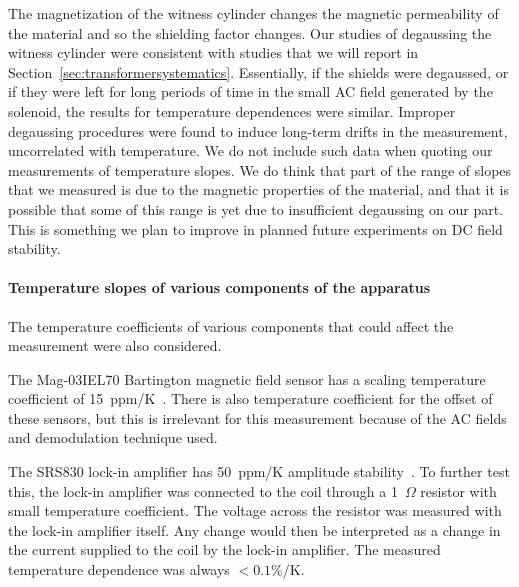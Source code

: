 



The magnetization of the witness cylinder changes the magnetic
permeability of the material and so the shielding factor changes.  Our
studies of degaussing the witness cylinder were consistent with
studies that we will report in
Section~\ref{sec:transformersystematics}.  Essentially, if the shields
were degaussed, or if they were left for long periods of time in the
small AC field generated by the solenoid, the results for temperature
dependences were similar.  Improper degaussing procedures were found
to induce long-term drifts in the measurement, uncorrelated with
temperature.  We do not include such data when quoting our
measurements of temperature slopes.  We do think that part of the
range of slopes that we measured is due to the magnetic properties of
the material, and that it is possible that some of this range is yet
due to insufficient degaussing on our part.  This is something we plan
to improve in planned future experiments on DC field stability.



\paragraph{Temperature slopes of various components of the apparatus}

The temperature coefficients of various components that could affect
the measurement were also considered.

The Mag-03IEL70 Bartington magnetic field sensor has a scaling
temperature coefficient of 15~ppm/K~\cite{bib:bartman}.  There is also
temperature coefficient for the offset of these sensors, but this is
irrelevant for this measurement because of the AC fields and
demodulation technique used.

The SRS830 lock-in amplifier has 50~ppm/K amplitude
stability~\cite{bib:lockin}.
To further test this, the lock-in amplifier was connected to the coil
through a 1~$\Omega$ resistor with small temperature coefficient.  The
voltage across the resistor was measured with the lock-in amplifier
itself.  Any change would then be interpreted as a change in the
current supplied to the coil by the lock-in amplifier.  The measured
temperature dependence was always $<0.1$\%/K.

